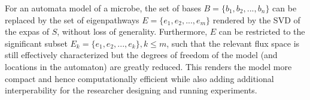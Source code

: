  






For an automata model of a microbe, the set of bases $B = \{ b_1, b_2, ..., b_n \}$ can be replaced by the set of eigenpathways $E = \{ e_1, e_2, ..., e_m \}$ rendered by the SVD of the expas of $S$, without loss of generality. Furthermore, $E$ can be restricted to the significant subset $E_k = \{ e_1, e_2, ..., e_k \}, k \leq m$, such that the relevant flux space is still effectively characterized but the degrees of freedom of the model (and locations in the automaton) are greatly reduced. This renders the model more compact and hence computationally efficient while also adding additional interperability for the researcher designing and running experiments.

